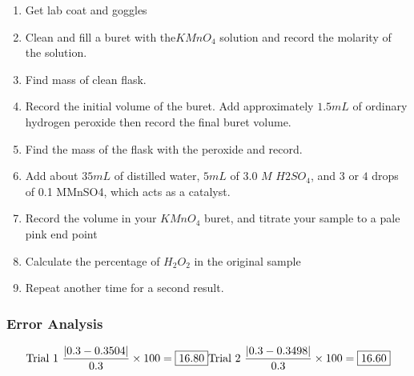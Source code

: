 \documentclass[
]{article}
\providecommand{\tightlist}{%
  \setlength{\itemsep}{0pt}\setlength{\parskip}{0pt}}
\begin{document}
\begin{enumerate}
\def\labelenumi{\arabic{enumi}.}
\tightlist
\item
  Get lab coat and goggles
\item
  Clean and fill a buret with the\(KMnO_4\) solution and record the
  molarity of the solution.
\item
  Find mass of clean flask.
\item
  Record the initial volume of the buret. Add approximately \(1.5 mL\)
  of ordinary hydrogen peroxide then record the final buret volume.
\item
  Find the mass of the flask with the peroxide and record.
\item
  Add about \(35 mL\) of distilled water, \(5 mL\) of \(3.0\) \(M\)
  \(H2SO_4\), and \(3\) or \(4\) drops of 0.1 MMnSO4, which acts as a
  catalyst.
\item
  Record the volume in your \(KMnO_4\) buret, and titrate your sample to
  a pale pink end point
\item
  Calculate the percentage of \(H_2O_2\) in the original sample
\item
  Repeat another time for a second result.
\end{enumerate}

\hypertarget{error-analysis}{%
\subsubsection{Error Analysis}\label{error-analysis}}

\[\text{Trial 1 } \frac{|0.3-0.3504|}{0.3} \times 100 = \boxed{16.80} \newline \text{Trial 2 }\frac{|0.3-0.3498|}{0.3} \times 100 = \boxed{16.60}\]
\end{document}
